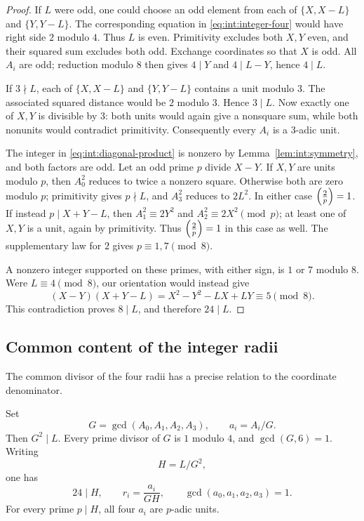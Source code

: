 \begin{proof}
If $L$ were odd, one could choose an odd element from each of
$\{X,X-L\}$ and $\{Y,Y-L\}$. The corresponding equation in
\eqref{eq:int:integer-four} would have right side $2$ modulo $4$.
Thus $L$ is even. Primitivity excludes both $X,Y$ even, and their
squared sum excludes both odd. Exchange coordinates so that $X$ is
odd. All $A_i$ are odd; reduction modulo $8$ then gives $4\mid Y$
and $4\mid L-Y$, hence $4\mid L$.

If $3\nmid L$, each of $\{X,X-L\}$ and $\{Y,Y-L\}$ contains a
unit modulo $3$. The associated squared distance would be $2$ modulo
$3$. Hence $3\mid L$. Now exactly one of $X,Y$ is divisible by $3$:
both units would again give a nonsquare sum, while both nonunits would
contradict primitivity. Consequently every $A_i$ is a $3$-adic unit.

The integer in \eqref{eq:int:diagonal-product} is nonzero by
Lemma~\ref{lem:int:symmetry}, and both factors are odd. Let an odd
prime $p$ divide $X-Y$. If $X,Y$ are units modulo $p$, then $A_0^2$
reduces to twice a nonzero square. Otherwise both are zero modulo $p$;
primitivity gives $p\nmid L$, and $A_3^2$ reduces to $2L^2$.
In either case $\left(\frac{2}{p}\right)=1$. If instead $p\mid X+Y-L$, then
$A_1^2\equiv2Y^2$ and $A_2^2\equiv2X^2\pmod p$; at least one of
$X,Y$ is a unit, again by primitivity. Thus $\left(\frac{2}{p}\right)=1$ in this case
as well. The supplementary law for $2$ gives $p\equiv1,7\pmod8$.

A nonzero integer supported on these primes, with either sign, is
$1$ or $7$ modulo $8$. Were $L\equiv4\pmod8$, our orientation would
instead give
\[
 (X-Y)(X+Y-L)=X^2-Y^2-LX+LY\equiv5\pmod8.
\]
This contradiction proves $8\mid L$, and therefore $24\mid L$.
\end{proof}

\subsection{Common content of the integer radii}

The common divisor of the four radii has a precise relation to the
coordinate denominator.

\begin{proposition}\label{int:content}
Set
\[
 G=\gcd(A_0,A_1,A_2,A_3),\qquad a_i=A_i/G.
\]
Then $G^2\mid L$. Every prime divisor of $G$ is $1$ modulo $4$,
and $\gcd(G,6)=1$. Writing
\begin{equation}\label{eq:int:content-normalization}
 H=L/G^2,
\end{equation}
one has
\[
 24\mid H,\qquad r_i=\frac{a_i}{GH},\qquad
 \gcd(a_0,a_1,a_2,a_3)=1.
\]
For every prime $p\mid H$, all four $a_i$ are $p$-adic units.
\end{proposition}

